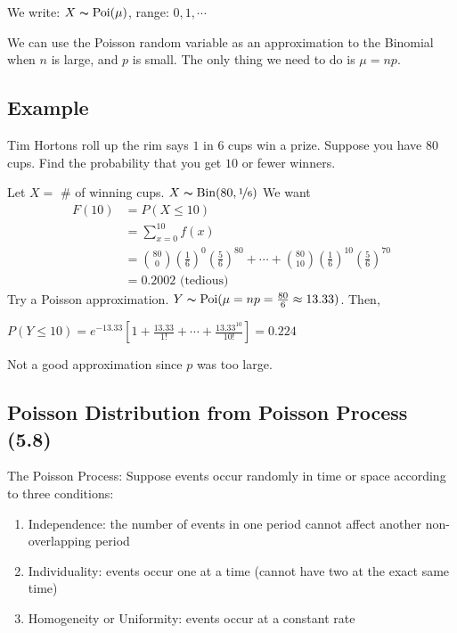 We write: $ X \thicksim \operatorname{Poi}(\mu) $, range: $ 0,1,\cdots $

We can use the Poisson random variable as an approximation to the Binomial
when $ n $ is large, and $ p $ is small. The only thing we need to do
is $ \mu=np $.

\subsection{Example}
Tim Hortons roll up the rim says $ 1 $ in $ 6 $ cups win a prize. Suppose
you have $ 80 $ cups. Find the probability that you get $ 10 $ or fewer
winners.

Let $ X= $ \# of winning cups. $ X \thicksim \operatorname{Bin}(80,\nicefrac{1}{6}) $
We want
\begin{align*}
    F(10)&=P(X\le 10)\\
    &=\sum\limits_{x=0}^{10} f(x)\\
    &=\binom{80}{0}\left(\frac{1}{6}\right)^0\left(\frac{5}{6}\right)^{80}+\cdots+
    \binom{80}{10}\left(\frac{1}{6}\right)^{10}\left(\frac{5}{6}\right)^{70}\\
    &=0.2002 \text{ (tedious) }
\end{align*}
Try a Poisson approximation.
$ Y \thicksim \operatorname{Poi}(\mu=np=\frac{80}{6}\approx 13.33) $. Then, 

$ P(Y\le 10)=e^{-13.33}\left[1+\frac{13.33}{1!}+\cdots+\frac{13.33^10}{10!}\right]=0.224 $

Not a good approximation since $ p $ was too large.

\subsection{Poisson Distribution from Poisson Process (5.8)}
The Poisson Process: Suppose events occur randomly in time or space
according to three conditions:
\begin{enumerate}[(1)]
    \item Independence: the number of events in one period cannot affect another non-overlapping period
    \item Individuality: events occur one at a time (cannot have two at the exact same time)
    \item Homogeneity or Uniformity: events occur at a constant rate
\end{enumerate}
